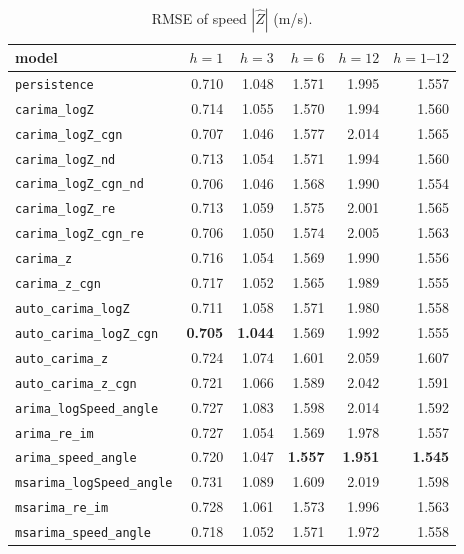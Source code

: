 \documentclass[11pt,a4paper]{article}
\newcommand{\1}{\mathbf{1}}
\begin{document}
\begin{table}[H]
  \centering
  \caption{RMSE of speed $|\hat Z|$ (m/s).}\label{tab:rmse-speed}
  \begin{tabular}{lrrrrr}
    \toprule
    model & $h=1$ & $h=3$ & $h=6$ & $h=12$ & $h=1$--$12$ \\
    \midrule
\texttt{persistence} & 0.710 & 1.048 & 1.571 & 1.995 & 1.557 \\ \midrule
\texttt{carima\_logZ} & 0.714 & 1.055 & 1.570 & 1.994 & 1.560 \\
\texttt{carima\_logZ\_cgn} & 0.707 & 1.046 & 1.577 & 2.014 & 1.565 \\
\texttt{carima\_logZ\_nd} & 0.713 & 1.054 & 1.571 & 1.994 & 1.560 \\
\texttt{carima\_logZ\_cgn\_nd} & 0.706 & 1.046 & 1.568 & 1.990 & 1.554 \\
\texttt{carima\_logZ\_re} & 0.713 & 1.059 & 1.575 & 2.001 & 1.565 \\
\texttt{carima\_logZ\_cgn\_re} & 0.706 & 1.050 & 1.574 & 2.005 & 1.563 \\
\texttt{carima\_z} & 0.716 & 1.054 & 1.569 & 1.990 & 1.556 \\
\texttt{carima\_z\_cgn} & 0.717 & 1.052 & 1.565 & 1.989 & 1.555 \\ \midrule
\texttt{auto\_carima\_logZ} & 0.711 & 1.058 & 1.571 & 1.980 & 1.558 \\
\texttt{auto\_carima\_logZ\_cgn} & \textbf{0.705} & \textbf{1.044} & 1.569 & 1.992 & 1.555 \\
\texttt{auto\_carima\_z} & 0.724 & 1.074 & 1.601 & 2.059 & 1.607 \\
\texttt{auto\_carima\_z\_cgn} & 0.721 & 1.066 & 1.589 & 2.042 & 1.591 \\ \midrule
\texttt{arima\_logSpeed\_angle} & 0.727 & 1.083 & 1.598 & 2.014 & 1.592 \\
\texttt{arima\_re\_im} & 0.727 & 1.054 & 1.569 & 1.978 & 1.557 \\
\texttt{arima\_speed\_angle} & 0.720 & 1.047 & \textbf{1.557} & \textbf{1.951} & \textbf{1.545} \\
\texttt{msarima\_logSpeed\_angle} & 0.731 & 1.089 & 1.609 & 2.019 & 1.598 \\
\texttt{msarima\_re\_im} & 0.728 & 1.061 & 1.573 & 1.996 & 1.563 \\
\texttt{msarima\_speed\_angle} & 0.718 & 1.052 & 1.571 & 1.972 & 1.558 \\
    \bottomrule
  \end{tabular}
\end{table}
\end{document}
